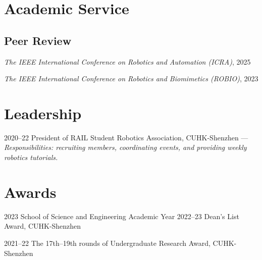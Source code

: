 \documentclass[11pt,letterpaper]{report}
\newcommand{\listitemspace}{0.25em}
\renewenvironment{itemize}
{\begin{list}{}{\setlength{\leftmargin}{0em}
			\setlength{\parskip}{0em}
			\setlength{\itemsep}{\listitemspace}
			\setlength{\parsep}{\listitemspace}}}
	{\end{list}}
\begin{document}
\section*{Academic Service}
\subsection*{Peer Review}
\begin{itemize}
	\item \textit{The IEEE International Conference on Robotics and Automation (ICRA)}, 2025
	\item \textit{The IEEE International Conference on Robotics and Biomimetics (ROBIO)}, 2023 
\end{itemize}
	
	
\section*{Leadership}
\begin{tablist}
	\item[2020--22]   \tab President of RAIL Student Robotics Association, CUHK-Shenzhen --- \textit{Responsibilities: recruiting members, coordinating events, and providing weekly robotics tutorials.}
\end{tablist}
	
\section*{Awards}
\begin{tablist}
	\item[2023]   \tab School of Science and Engineering Academic Year 2022--23 Dean's List Award, CUHK-Shenzhen
	\item[2021--22]   \tab The 17th--19th rounds of  Undergraduate Research Award, CUHK-Shenzhen
\end{tablist}
	
\end{document}
